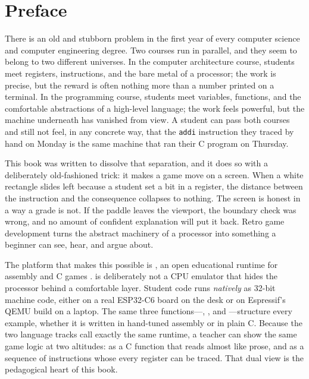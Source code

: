 \chapter*{Preface}

There is an old and stubborn problem in the first year of every computer science
and computer engineering degree. Two courses run in parallel, and they seem to
belong to two different universes. In the computer architecture course, students
meet registers, instructions, and the bare metal of a processor; the work is
precise, but the reward is often nothing more than a number printed on a
terminal. In the programming course, students meet variables, functions, and
the comfortable abstractions of a high-level language; the work feels powerful,
but the machine underneath has vanished from view. A student can pass both
courses and still not feel, in any concrete way, that the \texttt{addi}
instruction they traced by hand on Monday is the same machine that ran their C
program on Thursday.

This book was written to dissolve that separation, and it does so with a
deliberately old-fashioned trick: it makes a game move on a screen. When a
white rectangle slides left because a student set a bit in a register, the
distance between the instruction and the consequence collapses to nothing. The
screen is honest in a way a grade is not. If the paddle leaves the viewport, the
boundary check was wrong, and no amount of confident explanation will put it
back. Retro game development turns the abstract machinery of a processor into
something a beginner can see, hear, and argue about.

The platform that makes this possible is \prg, an open educational runtime for
\riscv assembly and C games \citep{prg32repo}. \prg is deliberately not a CPU
emulator that hides the processor behind a comfortable layer. Student code runs
\emph{natively} as 32-bit \riscv machine code, either on a real ESP32\nobreakdash-C6
board on the desk or on Espressif's QEMU build on a laptop. The same three
functions---, , and ---structure every
example, whether it is written in hand-tuned assembly or in plain C. Because the
two language tracks call exactly the same runtime, a teacher can show the same
game logic at two altitudes: as a C function that reads almost like prose, and as
a sequence of \riscv instructions whose every register can be traced. That dual
view is the pedagogical heart of this book.

